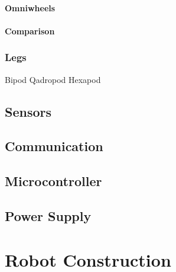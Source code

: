 \documentclass[11pt,a4paper]{article}
\begin{document}
\paragraph{Omniwheels}

\paragraph{Comparison}


\subsubsection{Legs}
Bipod
Qadropod
Hexapod

\subsection{Sensors}
\subsection{Communication}
\subsection{Microcontroller}
\subsection{Power Supply}

\section{Robot Construction}



\nocite{*}
\printbibliography
{}
\end{document}
